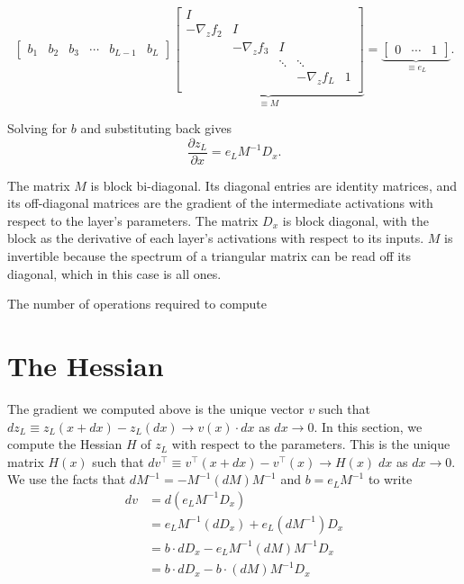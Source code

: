 \documentclass{article}
\begin{document}
\begin{equation}
    \begin{bmatrix}
        b_1 & b_2 & b_3 & \cdots & b_{L-1} & b_L
    \end{bmatrix}
    \underbrace{
        \begin{bmatrix}
            I                                                          \\
            -\nabla_z f_2 & I                                          \\
                          & -\nabla_z f_3 & I                          \\
                          &               & \ddots & \ddots            \\
                          &               &        & -\nabla_z f_L & 1 \\
        \end{bmatrix}
    }_{\equiv M}
    =
    \underbrace{\begin{bmatrix}
            0 & \cdots & 1
        \end{bmatrix}
    }_{\equiv e_L}.
\end{equation}

Solving for $b$ and substituting back gives
\begin{equation}
    \frac{\partial z_L}{\partial x} =  e_L M^{-1} D_x.
\end{equation}

The matrix $M$ is block bi-diagonal. Its diagonal entries are identity matrices, and its off-diagonal matrices are the
gradient of the intermediate activations with respect to the layer's parameters. The matrix $D_x$ is block diagonal,
with the block as the derivative of each layer's activations with respect to its inputs. $M$ is invertible because the
spectrum of a triangular matrix can be read off its diagonal, which in this case is all ones.

The number of operations required to compute

\section{The Hessian}

The gradient we computed above is the unique vector $v$ such that $d z_L \equiv z_L(x+dx) - z_L(dx) \to v(x) \cdot dx$
as $dx\to 0$. In this section, we compute the Hessian $H$ of $z_L$ with respect to the parameters. This is the unique
matrix $H(x)$ such that $dv^\top \equiv v^\top(x+dx) - v^\top(x) \to H(x)\; dx$ as $dx \to 0$. We use the facts that
$dM^{-1} = -M^{-1} (dM) M^{-1}$ and $b=e_L M^{-1}$ to write
\begin{align}
    dv & = d(e_L M^{-1} D_x) \nonumber                               \\
    & = e_L M^{-1} (dD_x)+ e_L \left(dM^{-1}\right) D_x \nonumber \\
    & = b \cdot dD_x  - e_L M^{-1} (dM) M^{-1} D_x \nonumber      \\
    & = b \cdot dD_x  - b \cdot (dM) M^{-1} D_x
\end{align}
\end{document}
